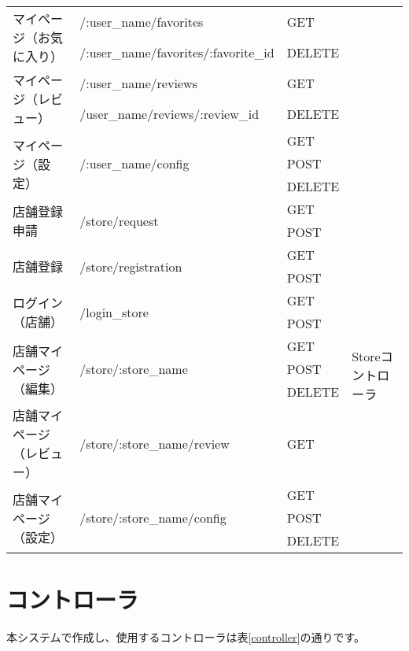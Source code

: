 \documentclass[a4j,titlepage]{jarticle}
\begin{document}
\begin{table}[!htbp]
\begin{center}
\begin{tabular}{|l|l|l|p{4cm}|}
\multirow{2}{*}{マイページ（お気に入り）} & /:user\_name/favorites
& GET & \\\cline{2-3}
 & /:user\_name/favorites/:favorite\_id & DELETE & \\\cline{1-3}
\multirow{2}{*}{マイページ（レビュー）} & /:user\_name/reviews
& GET & \\\cline{2-3}
 & /user\_name/reviews/:review\_id & DELETE & \\\cline{1-3}
\multirow{3}{*}{マイページ（設定）} & \multirow{3}{*}{/:user\_name/config}
& GET & \\\cline{3-3}
 & & POST & \\\cline{3-3}
 & & DELETE & \\\hline
 \multirow{2}{*}{店舗登録申請} & \multirow{2}{*}{/store/request}
 & GET & \multirow{13}{*}{Storeコントローラ} \\\cline{3-3}
  & & POST &\\\cline{1-3}
 \multirow{2}{*}{店舗登録} & \multirow{2}{*}{/store/registration}
 & GET &\\\cline{3-3}
  & & POST &\\\cline{1-3}
 \multirow{2}{*}{ログイン（店舗）} & \multirow{2}{*}{/login\_store}
 & GET & \\\cline{3-3}
  & & POST & \\\cline{1-3}
\multirow{3}{*}{店舗マイページ（編集）}& \multirow{3}{*}{/store/:store\_name}
& GET & \\\cline{3-3}
 & & POST & \\\cline{3-3}
 & & DELETE & \\\cline{1-3}
店舗マイページ（レビュー） & /store/:store\_name/review
& GET & \\\cline{1-3}
\multirow{3}{*}{店舗マイページ（設定）} & \multirow{3}{*}{/store/:store\_name/config}
& GET & \\\cline{3-3}
 & & POST & \\\cline{3-3}
 & & DELETE & \\\hline
\end{tabular}
\end{center}
\end{table}

\section{コントローラ}
本システムで作成し、使用するコントローラは表\ref{controller}の通りです。
\end{document}

